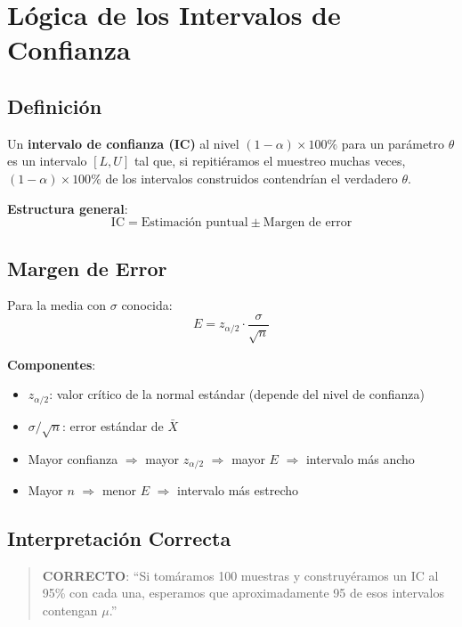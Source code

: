 \documentclass[11pt, a4paper]{article}
\begin{document}
\section{L\'ogica de los Intervalos de Confianza}

\subsection{Definici\'on}

Un \textbf{intervalo de confianza (IC)} al nivel $(1-\alpha) \times 100\%$ para un par\'ametro $\theta$ es un intervalo $[L, U]$ tal que, si repiti\'eramos el muestreo muchas veces, $(1-\alpha) \times 100\%$ de los intervalos construidos contendr\'ian el verdadero $\theta$.

\textbf{Estructura general}:
\[
\boxed{\text{IC} = \text{Estimaci\'on puntual} \pm \text{Margen de error}}
\]

\subsection{Margen de Error}

Para la media con $\sigma$ conocida:
\[
E = z_{\alpha/2} \cdot \frac{\sigma}{\sqrt{n}}
\]

\textbf{Componentes}:
\begin{itemize}
  \item $z_{\alpha/2}$: valor cr\'itico de la normal est\'andar (depende del nivel de confianza)
  \item $\sigma / \sqrt{n}$: error est\'andar de $\bar{X}$
  \item Mayor confianza $\Rightarrow$ mayor $z_{\alpha/2}$ $\Rightarrow$ mayor $E$ $\Rightarrow$ intervalo m\'as ancho
  \item Mayor $n$ $\Rightarrow$ menor $E$ $\Rightarrow$ intervalo m\'as estrecho
\end{itemize}

\subsection{Interpretaci\'on Correcta}

\begin{quote}
\textbf{CORRECTO}: ``Si tom\'aramos 100 muestras y construy\'eramos un IC al 95\% con cada una, esperamos que aproximadamente 95 de esos intervalos contengan $\mu$.''
\end{quote}
\end{document}
